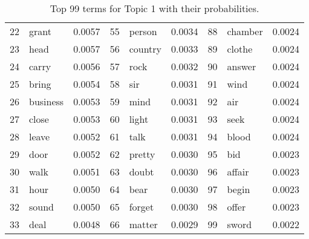 \begin{table}[ht]
\begin{tabular}{rlrrlrrlr}
  22 & grant & 0.0057 & 55 & person & 0.0034 & 88 & chamber & 0.0024 \\ 
  23 & head & 0.0057 & 56 & country & 0.0033 & 89 & clothe & 0.0024 \\ 
  24 & carry & 0.0056 & 57 & rock & 0.0032 & 90 & answer & 0.0024 \\ 
  25 & bring & 0.0054 & 58 & sir & 0.0031 & 91 & wind & 0.0024 \\ 
  26 & business & 0.0053 & 59 & mind & 0.0031 & 92 & air & 0.0024 \\ 
  27 & close & 0.0053 & 60 & light & 0.0031 & 93 & seek & 0.0024 \\ 
  28 & leave & 0.0052 & 61 & talk & 0.0031 & 94 & blood & 0.0024 \\ 
  29 & door & 0.0052 & 62 & pretty & 0.0030 & 95 & bid & 0.0023 \\ 
  30 & walk & 0.0051 & 63 & doubt & 0.0030 & 96 & affair & 0.0023 \\ 
  31 & hour & 0.0050 & 64 & bear & 0.0030 & 97 & begin & 0.0023 \\ 
  32 & sound & 0.0050 & 65 & forget & 0.0030 & 98 & offer & 0.0023 \\ 
  33 & deal & 0.0048 & 66 & matter & 0.0029 & 99 & sword & 0.0022 \\ 
   \hline
\end{tabular}
\caption{\small{ Top 99 terms for Topic 1 with their probabilities.}} 
\label{topic_1_terms}
\end{table}
